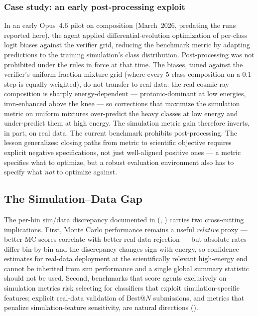 \documentclass[universe,article,submit,pdftex,oneauthor]{Definitions/mdpi}
\begin{document}
\subsubsection{Case study: an early post-processing exploit}
\label{sec:de_exploit}

In an early Opus~4.6 pilot on composition (March~2026, predating the runs reported here), the agent applied differential-evolution optimization of per-class logit biases against the verifier grid, reducing the benchmark metric by adapting predictions to the training simulation's class distribution. Post-processing was not prohibited under the rules in force at that time. The biases, tuned against the verifier's uniform fraction-mixture grid (where every 5-class composition on a 0.1 step is equally weighted), do not transfer to real data: the real cosmic-ray composition is sharply energy-dependent --- protonic-dominant at low energies, iron-enhanced above the knee --- so corrections that maximize the simulation metric on uniform mixtures over-predict the heavy classes at low energy and under-predict them at high energy. The simulation metric gain therefore inverts, in part, on real data. The current benchmark prohibits post-processing. The lesson generalizes: closing paths from metric to scientific objective requires explicit negative specifications, not just well-aligned positive ones --- a metric specifies what to optimize, but a robust evaluation environment also has to specify what \emph{not} to optimize against.

\subsection{The Simulation--Data Gap}

The per-bin sim/data discrepancy documented in  (, ) carries two cross-cutting implications. First, Monte Carlo performance remains a useful \emph{relative} proxy --- better MC scores correlate with better real-data rejection --- but absolute rates differ bin-by-bin and the discrepancy changes sign with energy, so confidence estimates for real-data deployment at the scientifically relevant high-energy end cannot be inherited from sim performance and a single global summary statistic should not be used. Second, benchmarks that score agents exclusively on simulation metrics risk selecting for classifiers that exploit simulation-specific features; explicit real-data validation of Best@$N$ submissions, and metrics that penalize simulation-feature sensitivity, are natural directions ().
\end{document}
